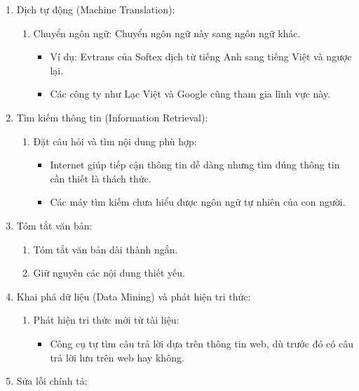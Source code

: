 \begin{enumerate}
\begin{enumerate}
        \end{enumerate}
        \item Dịch tự động (Machine Translation):
        \begin{enumerate}
            \item Chuyển ngôn ngữ: Chuyển ngôn ngữ này sang ngôn ngữ khác.
            \begin{itemize}
                \item Ví dụ: Evtrans của Softex dịch từ tiếng Anh sang tiếng Việt và ngược lại.
                \item Các công ty như Lạc Việt và Google cũng tham gia lĩnh vực này.
            \end{itemize}
        \end{enumerate}
        
        \item Tìm kiếm thông tin (Information Retrieval):
        \begin{enumerate}
            \item Đặt câu hỏi và tìm nội dung phù hợp:
            \begin{itemize}
                \item Internet giúp tiếp cận thông tin dễ dàng nhưng tìm đúng thông tin cần thiết là thách thức.
                \item Các máy tìm kiếm chưa hiểu được ngôn ngữ tự nhiên của con người.
            \end{itemize}
        \end{enumerate}
        \item Tóm tắt văn bản: 
        \begin{enumerate}
            \item Tóm tắt văn bản dài thành ngắn.
            \item Giữ nguyên các nội dung thiết yếu.
        \end{enumerate}
        \item Khai phá dữ liệu (Data Mining) và phát hiện tri thức:
        \begin{enumerate}
            \item Phát hiện tri thức mới từ tài liệu:
            \begin{itemize}
                \item Công cụ tự tìm câu trả lời dựa trên thông tin web, dù trước đó có câu trả lời lưu trên web hay không.
            \end{itemize}
        \end{enumerate}
        \item  Sửa lỗi chính tả:

\end{enumerate}
